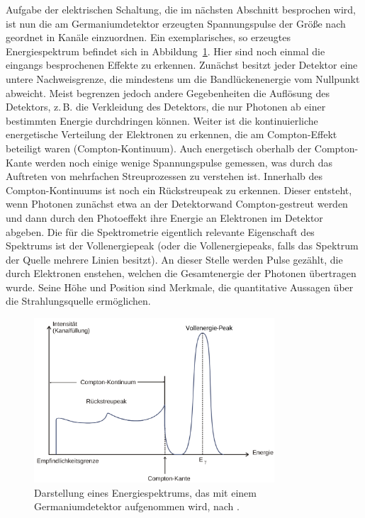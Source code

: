 Aufgabe der elektrischen Schaltung, die im nächsten Abschnitt besprochen wird, ist nun die am Germaniumdetektor erzeugten Spannungspulse der
Größe nach geordnet in Kanäle einzuordnen. Ein exemplarisches, so erzeugtes Energiespektrum befindet sich in
Abbildung~\ref{fig: example_spectrum}. Hier sind noch einmal die eingangs besprochenen Effekte zu erkennen. Zunächst besitzt jeder
Detektor eine untere Nachweisgrenze, die mindestens um die Bandlückenenergie vom Nullpunkt abweicht. Meist begrenzen jedoch
andere Gegebenheiten die Auflösung des Detektors, z.\,B. die Verkleidung des Detektors, die nur Photonen ab einer bestimmten Energie
durchdringen können. Weiter ist die kontinuierliche energetische Verteilung der Elektronen zu erkennen, die am Compton-Effekt
beteiligt waren (Compton-Kontinuum). Auch energetisch oberhalb der Compton-Kante werden noch einige wenige Spannungspulse gemessen,
was durch das Auftreten von mehrfachen Streuprozessen zu verstehen ist. Innerhalb des Compton-Kontinuums ist noch ein Rückstreupeak
zu erkennen. Dieser entsteht, wenn Photonen zunächst etwa an der Detektorwand Compton-gestreut werden und dann durch den
Photoeffekt ihre Energie an Elektronen im Detektor abgeben.
Die für die Spektrometrie eigentlich relevante Eigenschaft des Spektrums ist der Vollenergiepeak (oder die Vollenergiepeaks, falls
das Spektrum der Quelle mehrere Linien besitzt). An dieser Stelle werden Pulse gezählt, die durch Elektronen enstehen, welchen
die Gesamtenergie der Photonen übertragen wurde.
Seine Höhe und Position sind Merkmale, die quantitative Aussagen über die Strahlungsquelle ermöglichen. 


\begin{figure}
\centering
\includegraphics[width = 0.8\textwidth]{pics/example_spectrum.pdf}
\caption{Darstellung eines Energiespektrums, das mit einem Germaniumdetektor aufgenommen wird, nach \cite{anleitungv18}.}
\label{fig: example_spectrum}
\end{figure}

